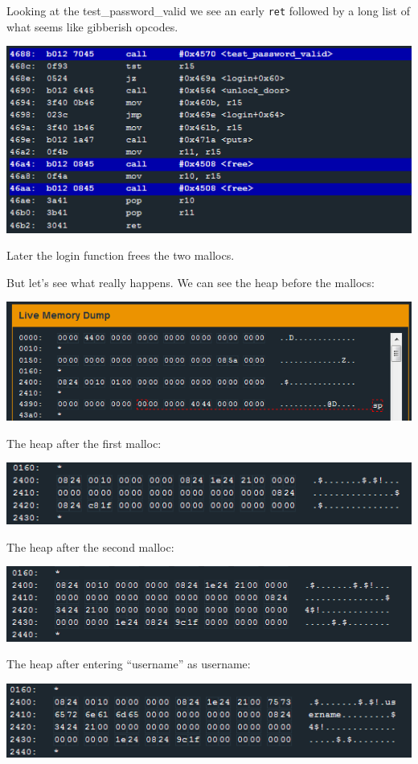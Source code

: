 \documentclass[a4paper,11pt]{article}
\begin{document}
Looking at the test\_password\_valid we see an early \texttt{ret}
followed by a long list of what seems like gibberish opcodes.

\includegraphics{img/14_4.PNG}

Later the login function frees the two mallocs.

But let's see what really happens. We can see the heap before the
mallocs:

\includegraphics{img/14_5.PNG}

The heap after the first malloc:

\includegraphics{img/14_6.PNG}

The heap after the second malloc:

\includegraphics{img/14_7.PNG}

The heap after entering ``username'' as username:

\includegraphics{img/14_8.PNG}
\end{document}
